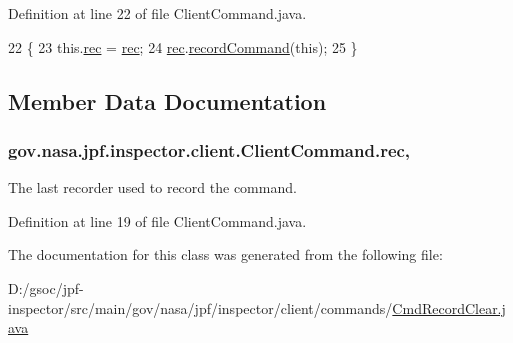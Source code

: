 Definition at line 22 of file Client\+Command.\+java.


\begin{DoxyCode}
22                                                   \{
23     this.\hyperlink{classgov_1_1nasa_1_1jpf_1_1inspector_1_1client_1_1_client_command_af4246f2427035c72a6af45a2c61361f7}{rec} = \hyperlink{classgov_1_1nasa_1_1jpf_1_1inspector_1_1client_1_1_client_command_af4246f2427035c72a6af45a2c61361f7}{rec};
24     \hyperlink{classgov_1_1nasa_1_1jpf_1_1inspector_1_1client_1_1_client_command_af4246f2427035c72a6af45a2c61361f7}{rec}.\hyperlink{classgov_1_1nasa_1_1jpf_1_1inspector_1_1client_1_1_command_recorder_af5f212124179773e46c8b45f1d01a32d}{recordCommand}(\textcolor{keyword}{this});
25   \}
\end{DoxyCode}


\subsection{Member Data Documentation}
\subsubsection[{\texorpdfstring{rec}{rec}}]{ gov.\+nasa.\+jpf.\+inspector.\+client.\+Client\+Command.\+rec\hspace{0.3cm}{\ttfamily [protected]}, {\ttfamily [inherited]}}\hypertarget{classgov_1_1nasa_1_1jpf_1_1inspector_1_1client_1_1_client_command_af4246f2427035c72a6af45a2c61361f7}{}\label{classgov_1_1nasa_1_1jpf_1_1inspector_1_1client_1_1_client_command_af4246f2427035c72a6af45a2c61361f7}


The last recorder used to record the command. 



Definition at line 19 of file Client\+Command.\+java.



The documentation for this class was generated from the following file\+:\begin{DoxyCompactItemize}
\item 
D\+:/gsoc/jpf-\/inspector/src/main/gov/nasa/jpf/inspector/client/commands/\hyperlink{_cmd_record_clear_8java}{Cmd\+Record\+Clear.\+java}\end{DoxyCompactItemize}
